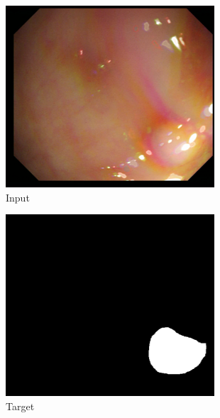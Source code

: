 \begin{figure}
	\centering
	\begin{subfigure}{.19\textwidth}
		\centering
		\includegraphics[width=.9\linewidth]{img/results/min_input}
		\caption{Input}
	\end{subfigure}
	\begin{subfigure}{.19\textwidth}
		\centering
		\includegraphics[width=.9\linewidth]{img/results/min_target}
		\caption{Target}
	\end{subfigure}
	\begin{subfigure}{.19\textwidth}
		\centering

\end{subfigure}
\end{figure}

